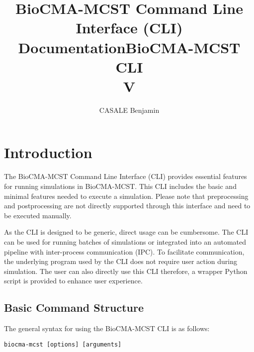 \documentclass{../docclass}
\title{BioCMA-MCST Command Line Interface (CLI) Documentation}
\author{}
\date{}
\begin{document}
\title{BioCMA-MCST CLI \\V \myversion}
\author{CASALE Benjamin}
\date{}
\maketitle
\tableofcontents 

\section*{Introduction}

The BioCMA-MCST Command Line Interface (CLI) provides essential features for running simulations in BioCMA-MCST. This CLI includes the basic and minimal features needed to execute a simulation. Please note that preprocessing and postprocessing are not directly supported through this interface and need to be executed manually.

As the CLI is designed to be generic, direct usage can be cumbersome. The CLI can be used for running batches of simulations or integrated into an automated pipeline with inter-process communication (IPC). To facilitate communication, the underlying program used by the CLI does not require user action during simulation. The user can also directly use this CLI therefore, a wrapper Python script is provided to enhance user experience. 

\subsection{Basic Command Structure}

The general syntax for using the BioCMA-MCST CLI is as follows:

\begin{verbatim}
biocma-mcst [options] [arguments]
\end{verbatim}



\appendix



\addListofFiguresTablesBibliography
\end{document}
